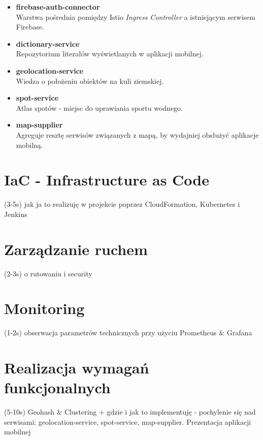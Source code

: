 \begin{itemize}
    \item
    \textbf{firebase-auth-connector}\\ 
    Warstwa pośrednia pomiędzy Istio \emph{Ingress Controller} a istniejącym serwisem Firebase.
    

    \item
    \textbf{dictionary-service}\\ 
    Repozytorium literałów wyświetlanych w aplikacji mobilnej.

    \item
    \textbf{geolocation-service}\\ 
    Wiedza o położeniu obiektów na kuli ziemskiej.

    \item
    \textbf{spot-service}\\ 
    Atlas spotów - miejsc do uprawiania sportu wodnego.

    \item
    \textbf{map-supplier}\\ 
    Agreguje resztę serwisów związanych z mapą, by wydajniej obsłużyć aplikacje mobilną.
\end{itemize} 





\section{IaC - Infrastructure as Code}
(3-5s) jak ja to realizuję w projekcie poprzez CloudFormation, Kubernetes i Jenkins 

\section{Zarządzanie ruchem}
(2-3s) o rutowaniu i security

\section{Monitoring}
(1-2s) obserwacja parametrów technicznych przy użyciu Prometheus \& Grafana


\section{Realizacja wymagań funkcjonalnych}
(5-10s) Geohash \& Clustering + gdzie i jak to implementuję 
- pochylenie się nad serwisami: geolocation-service, spot-service, map-supplier. 
Prezentacja aplikacji mobilnej